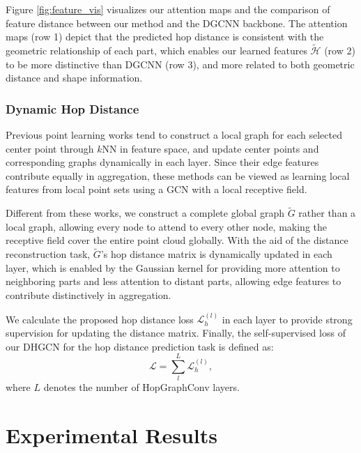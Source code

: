 \documentclass[letterpaper]{article} %
\begin{document}
Figure \ref{fig:feature_vis} visualizes our attention maps and the comparison of feature distance between our method and the DGCNN backbone.
The attention maps (row 1) depict that the predicted hop distance is consistent with the geometric relationship of each part, which enables our learned features \(\tilde{\mathcal{H}}\) (row 2) to be more distinctive than DGCNN (row 3), and more related to both geometric distance and shape information.


\subsubsection{Dynamic Hop Distance}
Previous point learning works \cite{dgcnn, pointnet++, guo2021pct} tend to construct a local graph for each selected center point through \(k\)NN in feature space, and update center points and corresponding graphs dynamically in each layer.
Since their edge features contribute equally in aggregation, these methods can be viewed as learning local features from local point sets using a GCN with a local receptive field.


Different from these works, we construct a complete global graph \(\tilde{G}\) rather than a local graph, allowing every node to attend to every other node, making the receptive field cover the entire point cloud globally.
With the aid of the distance reconstruction task,
\(\tilde{G}\)'s hop distance matrix is dynamically updated in each layer, which is enabled by the Gaussian kernel for providing more attention to neighboring parts and less attention to distant parts, allowing edge features to contribute distinctively in aggregation.


We calculate the proposed hop distance loss \(\mathcal{L}_h^{(l)}\) in each layer to provide strong supervision for updating the distance matrix. Finally,
the self-supervised loss of our DHGCN for the hop distance prediction task is defined as:
\begin{equation}
    \mathcal{L} = \sum_{l}^{L}\mathcal{L}_h^{(l)},
\end{equation}
where \(L\) denotes the number of HopGraphConv layers.



\section{Experimental Results}
\label{sec:results}
\end{document}
